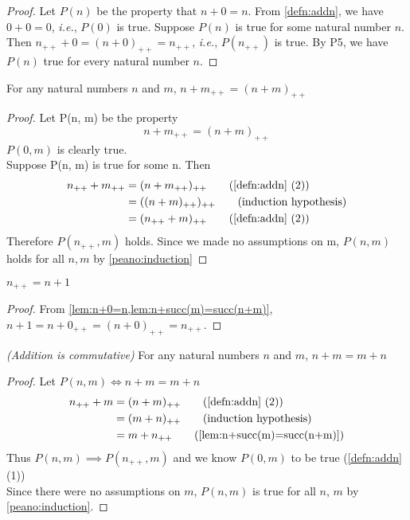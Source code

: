 \documentclass[12pt]{article}
\begin{document}
\begin{proof}
    Let $P(n)$ be the property that $n+0=n$. From \cref{defn:addn}, we have $0+0=0$, \emph{i.e.}, $P(0)$ is true. Suppose $P(n)$ is true for some natural number $n$. Then $n_{++}+0=(n+0)_{++}=n_{++}$, \emph{i.e.}, $P(n_{++})$ is true. By P5, we have $P(n)$ true for every natural number $n$.
\end{proof}

\begin{lem} \label{lem:n+succ(m)=succ(n+m)}
For any natural numbers $n$ and $m$, $n+m_{++}=(n+m)_{++}$
\end{lem}

\begin{proof}
    Let P(n, m) be the property
    \begin{equation*}
        n+m_{++}=(n+m)_{++}
    \end{equation*}
    $P(0, m)$ is clearly true. \\
    Suppose P(n, m) is true for some n. Then
    \begin{align*}
        n_{++}+m_{++} &= (n + m_{++})_{++}  \tag{\cref{defn:addn} (2)} \\
                      &= ((n+m)_{++})_{++}  \tag{induction hypothesis} \\
                      &= (n_{++}+m)_{++}    \tag{\cref{defn:addn} (2)}
    \end{align*}
    Therefore $P(n_{++}, m)$ holds. Since we made no assumptions on m, $P(n, m)$ holds for all $n, m$ by \cref{peano:induction}
\end{proof}

\begin{cor} \label{cor:succ(n)=n+1}
    $n_{++} = n + 1$
\end{cor}

\begin{proof}
    From \cref{lem:n+0=n,lem:n+succ(m)=succ(n+m)}, $n + 1 = n + 0_{++} = (n + 0)_{++} = n_{++}$.
\end{proof}

\begin{prop} \label{prop:addn is commutative}
\emph{(Addition is commutative)} For any natural numbers $n$ and $m$, $n + m = m + n$
\end{prop}

\begin{proof}
    Let $P(n, m) \iff n + m = m + n$
    \begin{align*}
        n_{++} + m &= (n + m)_{++} \tag{\cref{defn:addn} (2)} \\
                   &= (m + n)_{++} \tag{induction hypothesis} \\
                   &= m + n_{++}   \tag{\cref{lem:n+succ(m)=succ(n+m)}}
    \end{align*}
    Thus $P(n, m) \implies P(n_{++}, m)$ and we know $P(0, m)$ to be true (\cref{defn:addn} (1)) \\
    Since there were no assumptions on $m$, $P(n, m)$ is true for all $n$, $m$ by \cref{peano:induction}.
\end{proof}
\end{document}
